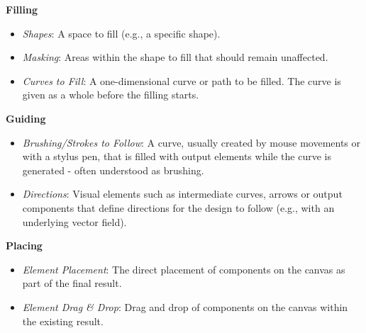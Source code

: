 \noindent\textbf{Filling}

\begin{itemize}
    \item \textit{Shapes}: A space to fill (e.g., a specific shape).
    \item \textit{Masking}: Areas within the shape to fill that should remain unaffected.
    \item \textit{Curves to Fill}: A one-dimensional curve or path to be filled. The curve is given as a whole before the filling starts.
\end{itemize}

\noindent\textbf{Guiding}

\begin{itemize}
    \item \textit{Brushing/Strokes to Follow}: A curve, usually created by mouse movements or with a stylus pen, that is filled with output elements while the curve is generated - often understood as brushing.
    \item \textit{Directions}: Visual elements such as intermediate curves, arrows or output components that define directions for the design to follow (e.g., with an underlying vector field).
\end{itemize}

\noindent\textbf{Placing}

\begin{itemize}
    \item \textit{Element Placement}: The direct placement of components on the canvas as part of the final result.
    \item \textit{Element Drag \& Drop}: Drag and drop of components on the canvas within the existing result.
\end{itemize}



